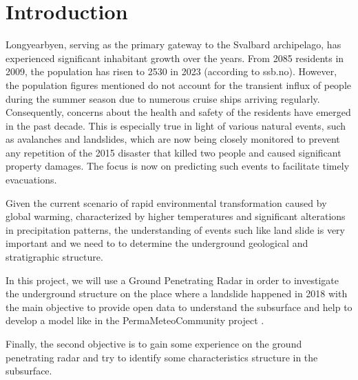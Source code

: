 \section{Introduction}

Longyearbyen, serving as the primary gateway to the Svalbard archipelago, has experienced significant inhabitant growth over the years. From 2085 residents in 2009, the population has risen to 2530 in 2023 (according to ssb.no). However, the population figures mentioned do not account for the transient influx of people during the summer season due to numerous cruise ships arriving regularly. Consequently, concerns about the health and safety of the residents have emerged in the past decade. This is especially true in light of various natural events, such as avalanches and landslides, which are now being closely monitored to prevent any repetition of the 2015 disaster that killed two people and caused significant property damages. The focus is now on predicting such events to facilitate timely evacuations.

Given the current scenario of rapid environmental transformation caused by global warming, characterized by higher temperatures and significant alterations in precipitation patterns, the understanding of events such like land slide is very important and we need to to determine the underground geological and stratigraphic structure.

In this project, we will use a Ground Penetrating Radar in order to investigate the underground structure on the place where a landslide happened in 2018 \cite{Landslide2018Longyeabyen} with the main objective to provide open data to understand the subsurface and help to develop a model like in the PermaMeteoCommunity project \cite{PermaMeteoCommunity}.

Finally, the second objective is to gain some experience on the ground penetrating radar and try to identify some characteristics structure in the subsurface.

